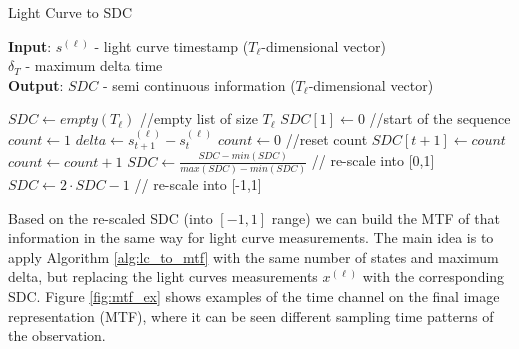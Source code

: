 \begin{algorithm}[t!] 
\caption{Light Curve to SDC}
\label{alg:lc_to_sdc}
\hspace*{\algorithmicindent} \textbf{Input}: $s^{(\ell)}$ - light curve timestamp ($T_{\ell}$-dimensional vector) \\
\hspace*{\algorithmicindent} \hspace{0.1\textwidth} $\delta_T$ - maximum delta time \\ 
\hspace*{\algorithmicindent} \textbf{Output}:  $SDC$ - semi continuous information ($T_{\ell}$-dimensional vector)
\begin{algorithmic}[1]
\State $SDC \gets empty(T_{\ell})$  //empty list of size $T_{\ell}$
\State $SDC[1] \gets 0$  //start of the sequence
\State $count \gets 1$
    \State $delta \gets s^{(\ell)}_{t+1}-s^{(\ell)}_t$
        \State $count \gets 0 $ //reset count
    \EndIf
    \State $SDC[t+1] \gets count $
    \State $count \gets count + 1 $
\EndFor
\State $SDC \gets \frac{SDC - min(SDC)}{ max(SDC) -min(SDC)} $ // re-scale into [0,1]
\State $SDC \gets 2 \cdot SDC - 1$ // re-scale into [-1,1]
\end{algorithmic}
\end{algorithm}
Based on the re-scaled SDC (into $[-1,1]$ range) we can build the MTF of that information in the same way for light curve measurements.
The main idea is to apply Algorithm \ref{alg:lc_to_mtf} with the same number of states and maximum delta, but replacing the light curves measurements $x^{(\ell)}$ with the corresponding SDC.
Figure \ref{fig:mtf_ex} shows examples of the time channel on the final image representation (MTF), where it can be seen different sampling time patterns of the observation.






